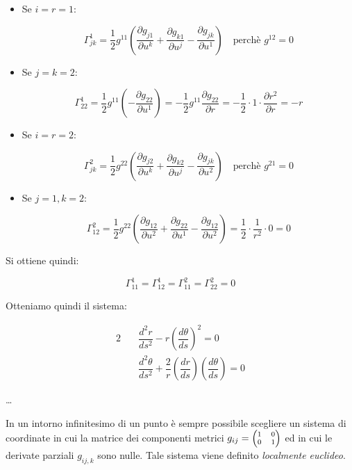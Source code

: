 \begin{itemize}

\item Se $i = r = 1$:

$$
\Gamma_{jk}^1 = \dfrac{1}{2} g^{11} \left( \dfrac{\partial g_{j1}}{\partial u^k} + \dfrac{\partial g_{k1}}{\partial u^j} - \dfrac{\partial g_{jk}}{\partial u^1} \right) \quad \text{perchè $g^{12} = 0$}
$$

\item Se $j = k = 2$:

$$
\Gamma_{22}^1 = \dfrac{1}{2} g^{11} \left( - \dfrac{\partial g_{22}}{\partial u^1} \right) = - \dfrac{1}{2} g^{11} \dfrac {\partial g_{22}}{\partial r} = - \dfrac{1}{2} \cdot 1 \cdot \dfrac{\partial r^2}{\partial r} = - r
$$

\item Se $i = r = 2$:

$$
\Gamma_{jk}^2 = \dfrac{1}{2} g^{22} \left( \dfrac{\partial g_{j2}}{\partial u^k} + \dfrac{\partial g_{k2}}{\partial u^j} - \dfrac{\partial g_{jk}}{\partial u^2} \right) \quad \text{perchè $g^{21} = 0$}
$$

\item Se $j = 1, k = 2$:

$$
\Gamma_{12}^2 = \dfrac{1}{2} g^{22} \left( \dfrac{\partial g_{12}}{\partial u^2} + \dfrac{\partial g_{22}}{\partial u^1} - \dfrac{\partial g_{12}}{\partial u^2} \right) = \dfrac{1}{2} \cdot \dfrac{1}{r^2} \cdot 0 = 0
$$

\end{itemize}

Si ottiene quindi:

$$
\boxed{\Gamma_{11}^1 = \Gamma_{12}^1 = \Gamma_{11}^2 = \Gamma_{22}^2 = 0}
$$

Otteniamo quindi il sistema:

\begin{alignat}{2}
\tag*{(I)}\quad & \dfrac{d^2 r}{ds^2} - r \left( \dfrac{d\theta}{ds} \right)^2 = 0 \\
\tag*{(II)}\quad & \dfrac{d^2 \theta}{ds^2} + \dfrac{2}{r} \left( \dfrac{dr}{ds} \right) \left( \dfrac{d\theta}{ds} \right) = 0
\end{alignat}

\dots

\newpage

In un intorno infinitesimo di un punto è sempre possibile scegliere un sistema di coordinate in cui la matrice dei componenti metrici
$
\scriptsize
g_{ij} = \begin{pmatrix} 1 & 0 \\ 0 & 1 \end{pmatrix}
$
ed in cui le derivate parziali $g_{ij,k}$ sono nulle. Tale sistema viene definito \emph{localmente euclideo}.

